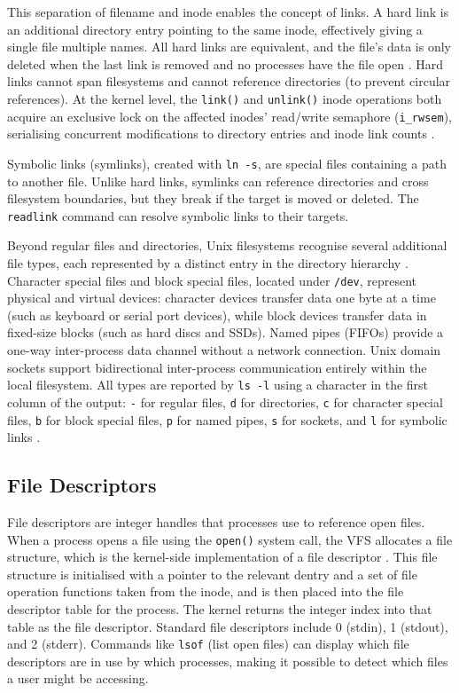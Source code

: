This separation of filename and inode enables the concept of links. A hard link is an additional directory entry pointing to the same inode, effectively giving a single file multiple names. All hard links are equivalent, and the file's data is only deleted when the last link is removed and no processes have the file open \parencite{KernelVFS}. Hard links cannot span filesystems and cannot reference directories (to prevent circular references). At the kernel level, the \texttt{link()} and \texttt{unlink()} inode operations both acquire an exclusive lock on the affected inodes' read/write semaphore (\texttt{i\_rwsem}), serialising concurrent modifications to directory entries and inode link counts \parencite{KernelFSLocking}.

Symbolic links (symlinks), created with \texttt{ln -s}, are special files containing a path to another file. Unlike hard links, symlinks can reference directories and cross filesystem boundaries, but they break if the target is moved or deleted. The \texttt{readlink} command can resolve symbolic links to their targets.

Beyond regular files and directories, Unix filesystems recognise several additional file types, each represented by a distinct entry in the directory hierarchy \parencite{GFGUnixFileSystem}. Character special files and block special files, located under \texttt{/dev}, represent physical and virtual devices: character devices transfer data one byte at a time (such as keyboard or serial port devices), while block devices transfer data in fixed-size blocks (such as hard discs and SSDs). Named pipes (FIFOs) provide a one-way inter-process data channel without a network connection. Unix domain sockets support bidirectional inter-process communication entirely within the local filesystem. All types are reported by \texttt{ls -l} using a character in the first column of the output: \texttt{-} for regular files, \texttt{d} for directories, \texttt{c} for character special files, \texttt{b} for block special files, \texttt{p} for named pipes, \texttt{s} for sockets, and \texttt{l} for symbolic links \parencite{GFGUnixFileSystem}.

\subsection{File Descriptors}
\label{FileDescriptors}

File descriptors are integer handles that processes use to reference open files. When a process opens a file using the \texttt{open()} system call, the VFS allocates a file structure, which is the kernel-side implementation of a file descriptor \parencite{KernelVFS}. This file structure is initialised with a pointer to the relevant dentry and a set of file operation functions taken from the inode, and is then placed into the file descriptor table for the process. The kernel returns the integer index into that table as the file descriptor. Standard file descriptors include 0 (stdin), 1 (stdout), and 2 (stderr). Commands like \texttt{lsof} (list open files) can display which file descriptors are in use by which processes, making it possible to detect which files a user might be accessing.

